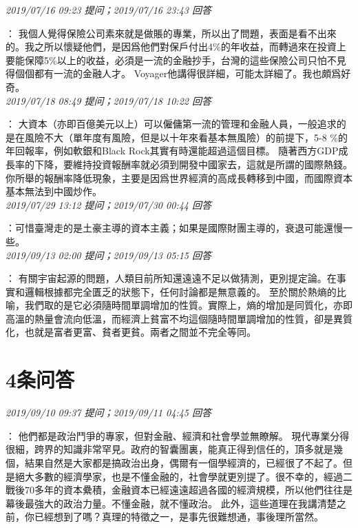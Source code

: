 \documentclass[twocolumn]{ctexart}
\begin{document}
\textit{\hfill\noindent\small 2019/07/16 09:23 提问；2019/07/16 23:43 回答}

：
我個人覺得保險公司素來就是做賬的專業，所以出了問題，表面是看不出來的。我之所以懷疑他們，是因爲他們對保戶付出4\%的年收益，而轉過來在投資上要能保障5\%以上的收益，必須是一流的金融抄手，台灣的這些保險公司只怕不見得個個都有一流的金融人才。
Voyager他講得很詳細，可能太詳細了。我也頗爲好奇。
\\

\textit{\hfill\noindent\small 2019/07/18 08:49 提问；2019/07/18 10:22 回答}

：
大資本（亦即百億美元以上）可以僱傭第一流的管理和金融人員，一般追求的是在風險不大（單年度有風險，但是以十年來看基本無風險）的前提下，5-8 \%的年回報率，例如軟銀和Black Rock其實有時還能超過這個目標。 
隨著西方GDP成長率的下降，要維持投資報酬率就必須到開發中國家去，這就是所謂的國際熱錢。你所舉的報酬率降低現象，主要是因爲世界經濟的高成長轉移到中國，而國際資本基本無法到中國炒作。
\\

\textit{\hfill\noindent\small 2019/07/29 13:12 提问；2019/07/30 00:44 回答}

：可惜臺灣走的是土豪主導的資本主義；如果是國際財團主導的，衰退可能還慢一些。
\\

\textit{\hfill\noindent\small 2019/09/13 02:00 提问；2019/09/13 05:15 回答}

：
有關宇宙起源的問題，人類目前所知還遠遠不足以做猜測，更別提定論。在事實和邏輯根據都完全匱乏的狀態下，任何討論都是無意義的。
至於關於熱熵的比喻，我們取的是它必須隨時間單調增加的性質。實際上，熵的增加是同質化，亦即高溫的熱量會流向低溫，而經濟上貧富不均這個隨時間單調增加的性質，卻是異質化，也就是富者更富、貧者更貧。兩者之間並不完全等同。
\\

\section{4条问答}

\textit{\hfill\noindent\small 2019/09/10 09:37 提问；2019/09/11 04:45 回答}

：
他們都是政治鬥爭的專家，但對金融、經濟和社會學並無瞭解。 
現代專業分得很細，跨界的知識非常罕見。政府的智囊團裏，能真正得到信任的，頂多就是幾個，結果自然是大家都是搞政治出身，偶爾有一個學經濟的，已經很了不起了。但是絕大多數的經濟學家，也是不懂金融的，社會學就更別提了。很不幸的，經過二戰後70多年的資本纍積，金融資本已經遠遠超過各國的經濟規模，所以他們往往是幕後最強大的政治力量。不懂金融，就不懂政治。 
此外，這些道理在我講清楚之前，你已經想到了嗎？真理的特徵之一，是事先很難想通，事後理所當然。
\\
\end{document}
